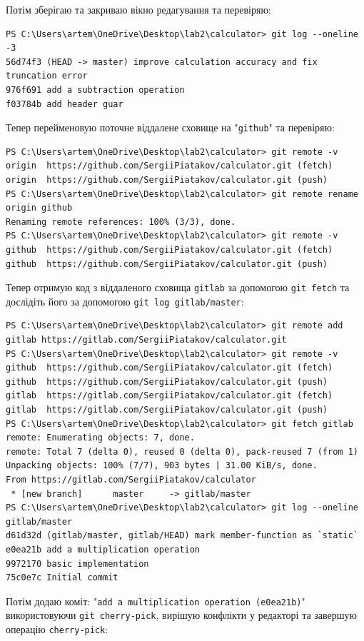 \documentclass[12pt,a4paper]{article}
\begin{document}
    Потім зберігаю та закриваю вікно редагування та перевіряю:
    \begin{verbatim}
PS C:\Users\artem\OneDrive\Desktop\lab2\calculator> git log --oneline -3 
56d74f3 (HEAD -> master) improve calculation accuracy and fix truncation error
976f691 add a subtraction operation
f03784b add header guar
    \end{verbatim}

    Тепер перейменовую поточне віддалене сховище на "\texttt{github}" та перевіряю:
    \begin{verbatim}
PS C:\Users\artem\OneDrive\Desktop\lab2\calculator> git remote -v 
origin  https://github.com/SergiiPiatakov/calculator.git (fetch)
origin  https://github.com/SergiiPiatakov/calculator.git (push)
PS C:\Users\artem\OneDrive\Desktop\lab2\calculator> git remote rename origin github 
Renaming remote references: 100% (3/3), done.
PS C:\Users\artem\OneDrive\Desktop\lab2\calculator> git remote -v
github  https://github.com/SergiiPiatakov/calculator.git (fetch)
github  https://github.com/SergiiPiatakov/calculator.git (push)
    \end{verbatim}

    Тепер отримую код з віддаленого сховища \texttt{gitlab} за допомогою \texttt{git fetch} та дослідіть його за допомогою \texttt{git log gitlab/master}:
    \begin{verbatim}
PS C:\Users\artem\OneDrive\Desktop\lab2\calculator> git remote add gitlab https://gitlab.com/SergiiPiatakov/calculator.git
PS C:\Users\artem\OneDrive\Desktop\lab2\calculator> git remote -v
github  https://github.com/SergiiPiatakov/calculator.git (fetch)
github  https://github.com/SergiiPiatakov/calculator.git (push)
gitlab  https://gitlab.com/SergiiPiatakov/calculator.git (fetch)
gitlab  https://gitlab.com/SergiiPiatakov/calculator.git (push)
PS C:\Users\artem\OneDrive\Desktop\lab2\calculator> git fetch gitlab
remote: Enumerating objects: 7, done.
remote: Total 7 (delta 0), reused 0 (delta 0), pack-reused 7 (from 1)
Unpacking objects: 100% (7/7), 903 bytes | 31.00 KiB/s, done.
From https://gitlab.com/SergiiPiatakov/calculator
 * [new branch]      master     -> gitlab/master
PS C:\Users\artem\OneDrive\Desktop\lab2\calculator> git log --oneline gitlab/master
d61d32d (gitlab/master, gitlab/HEAD) mark member-function as `static`
e0ea21b add a multiplication operation
9972170 basic implementation
75c0e7c Initial commit
    \end{verbatim}

    Потім додаю коміт: "\texttt{add a multiplication operation (e0ea21b)}" використовуючи \texttt{git cherry-pick}, вирішую конфлікти у редакторі та завершую
    операцію \texttt{cherry-pick}:
\end{document}
